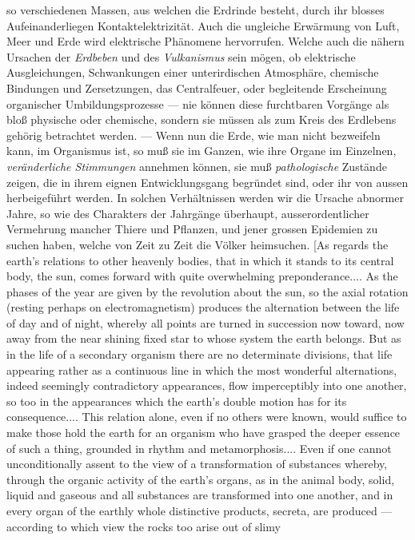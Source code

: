 \documentclass[12pt,a4paper]{book}
\begin{document}
{so verschiedenen Massen, aus welchen die Erdrinde besteht, durch ihr
blosses Aufeinanderliegen Kontaktelektrizität. Auch die ungleiche
Erwärmung von Luft, Meer und Erde wird elektrische Phänomene
hervorrufen. Welche auch die nähern Ursachen der \emph{Erdbeben} und des
\emph{Vulkanismus} sein mögen, ob elektrische Ausgleichungen,
Schwankungen
einer unterirdischen Atmosphäre, chemische Bindungen und
Zersetzungen, das Centralfeuer, oder begleitende Erscheinung
organischer Umbildungsprozesse --- nie können diese furchtbaren
Vorgänge als bloß physische oder chemische, sondern sie müssen als
zum Kreis des Erdlebens gehörig betrachtet werden. --- Wenn nun die
Erde, wie man nicht bezweifeln kann, im Organismus ist, so muß sie im
Ganzen, wie ihre Organe im Einzelnen, \emph{veränderliche Stimmungen}
annehmen können, sie muß \emph{pathologische} Zustände zeigen, die in
ihrem eignen Entwicklungsgang begründet sind, oder ihr von aussen
herbeigeführt werden. In solchen Verhältnissen werden wir die Ursache
abnormer Jahre, so wie des Charakters der Jahrgänge überhaupt,
ausserordentlicher Vermehrung mancher Thiere und Pflanzen, und jener
grossen Epidemien zu suchen haben, welche von Zeit zu Zeit die Völker
heimsuchen. [As regards the earth's relations to other heavenly bodies, that in
which it stands to its central body, the sun, comes forward with quite
overwhelming preponderance.... As the phases of the year are given by the
revolution about the sun, so the axial rotation (resting perhaps on
electromagnetism) produces the alternation between the life of day and of
night, whereby all points are turned in succession now toward, now away from
the near shining fixed star to whose system the earth belongs. But as in the
life of a secondary organism there are no determinate divisions, that life
appearing rather as a continuous line in which the most wonderful alternations,
indeed seemingly contradictory appearances, flow imperceptibly into one
another, so too in the appearances which the earth's double motion has for its
consequence.... This relation alone, even if no others were known, would suffice
to make those hold the earth for an organism who have grasped the deeper
essence of such a thing, grounded in rhythm and metamorphosis.... Even if one
cannot unconditionally assent to the view of a transformation of substances
whereby, through the organic activity of the earth's organs, as in the animal
body, solid, liquid and gaseous and all substances are transformed into one
another, and in every organ of the earthly whole distinctive products, secreta,
are produced --- according to which view the rocks too arise out of slimy
}
\end{document}

